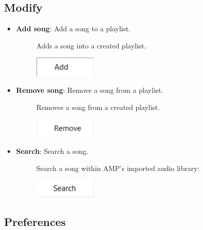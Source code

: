 \documentclass{article}
\begin{document}
\subsection{Modify}

\begin{itemize}
    \item \textbf{Add song}: Add a song to a playlist.
    \begin{description}
        \item[] Adds a song into a created playlist.
        \item[] \includegraphics[width=3cm]{Images/Modify Add.png}
    \end{description}
    \item \textbf{Remove song}: Remove a song from a playlist.
    \begin{description}
        \item[] Removes a song from a created playlist.
        \item[] \includegraphics[width=3cm]{Images/Modify Remove.png}
    \end{description}
    \item \textbf{Search}: Search a song.
    \begin{description}
        \item[] Search a song within AMP's imported audio library:
        \item[] \includegraphics[width=3cm]{Images/Modify Search.png}
    \end{description}
\end{itemize}

\subsection{Preferences}
\end{document}
